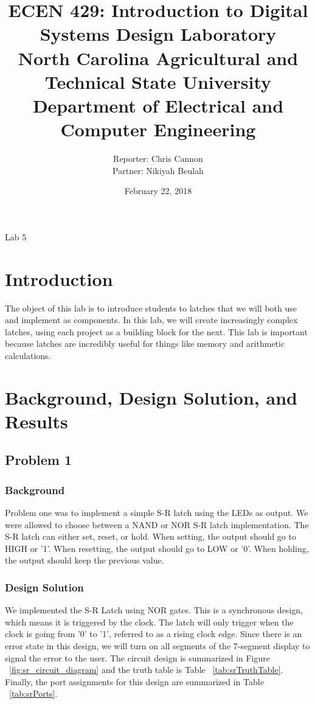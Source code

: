 \documentclass[11pt]{article}
\title {{\titleFont ECEN 429: Introduction to Digital Systems Design Laboratory \\ North Carolina Agricultural and Technical State University \\ Department of Electrical and Computer Engineering}} %
\author{\titleFont Reporter: Chris Cannon \\ \titleFont Partner: Nikiyah Beulah} %
\date{\titleFont February 22, 2018}
\begin{document}
\begin{titlingpage}
\maketitle
\begin{center}
	Lab 5
\end{center}
\end{titlingpage}

\section{Introduction}
The object of this lab is to introduce students to latches that we will both use and implement as components. In this lab, we will create increasingly complex latches, using each project as a building block for the next. This lab is important because latches are incredibly useful for things like memory and arithmetic calculations.

\section{Background, Design Solution, and Results}

\subsection{Problem 1 }

\subsubsection{Background}
Problem one was to implement a simple S-R latch using the LEDs as output. We were allowed to choose between a NAND or NOR S-R latch implementation. The S-R latch can either set, reset, or hold. When setting, the output should go to HIGH or '1'. When resetting, the output should go to LOW or '0'. When holding, the output should keep the previous value.

\subsubsection{Design Solution}
We implemented the S-R Latch using NOR gates. This is a synchronous design, which means it is triggered by the clock. The latch will only trigger when the clock is going from '0' to '1', referred to as a rising clock edge. Since there is an error state in this design, we will turn on all segments of the 7-segment display to signal the error to the user. The circuit design is summarized in Figure ~\ref{fig:sr_circuit_diagram} and the truth table is Table ~\ref{tab:srTruthTable}. Finally, the port assignments for this design are summarized in Table ~\ref{tab:srPorts}.
\end{document}
